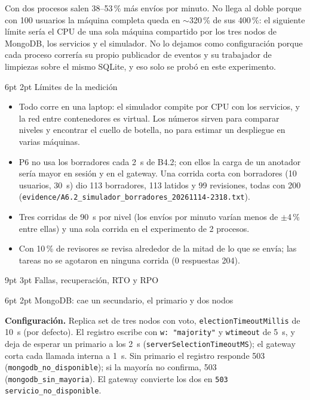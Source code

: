 \documentclass[10pt,letterpaper]{article}
\makeatletter
\newcommand{\ev}[1]{{\footnotesize\texttt{evidence/\allowbreak #1}}}
\renewcommand\section{\@startsection{section}{1}{\z@}%
  {9pt \@plus 2pt \@minus 1pt}{3pt}%
  {\normalfont\large\bfseries\color{acc}}}
\renewcommand\subsection{\@startsection{subsection}{2}{\z@}%
  {6pt \@plus 1pt}{2pt}%
  {\normalfont\normalsize\bfseries\color{acc}}}
\makeatother
\begin{document}
Con dos procesos salen 38--53\,\% más envíos por minuto. No llega al doble porque con 100 usuarios la
máquina completa queda en $\sim$320\,\% de sus 400\,\%: el siguiente límite sería el CPU de una sola máquina
compartido por los tres nodos de MongoDB, los servicios y el simulador. No lo dejamos como configuración
porque cada proceso correría su propio publicador de eventos y su trabajador de limpiezas sobre el mismo
SQLite, y eso solo se probó en este experimento.

\subsection{Límites de la medición}

\begin{itemize}\setlength{\itemsep}{1pt}
\item Todo corre en una laptop: el simulador compite por CPU con los servicios, y la red entre contenedores
es virtual. Los números sirven para comparar niveles y encontrar el cuello de botella, no para estimar un
despliegue en varias máquinas.
\item P6 no usa los borradores cada 2~s de B4.2; con ellos la carga de un anotador sería mayor en sesión y
en el gateway. Una corrida corta con borradores (10 usuarios, 30~s) dio 113 borradores, 113 latidos y 99
revisiones, todas con 200 (\ev{A6.2\_simulador\_borradores\_20261114-2318.txt}).
\item Tres corridas de 90~s por nivel (los envíos por minuto varían menos de $\pm$4\,\% entre ellas) y una
sola corrida en el experimento de 2 procesos.
\item Con 10\,\% de revisores se revisa alrededor de la mitad de lo que se envía; las tareas no se agotaron en
ninguna corrida (0 respuestas 204).
\end{itemize}


\section{Fallas, recuperación, RTO y RPO}

\subsection{MongoDB: cae un secundario, el primario y dos nodos}

\textbf{Configuración.} Replica set de tres nodos con voto, \texttt{electionTimeoutMillis} de 10~s (por
defecto). El registro escribe con \texttt{w: "majority"} y \texttt{wtimeout} de 5~s, y deja de esperar un
primario a los 2~s (\texttt{serverSelectionTimeoutMS}); el gateway corta cada llamada interna a 1~s. Sin
primario el registro responde 503 (\texttt{mongodb\_no\_disponible}); si la mayoría no confirma, 503
(\texttt{mongodb\_sin\_mayoria}). El gateway convierte los dos en \texttt{503 servicio\_no\_disponible}.
\end{document}
